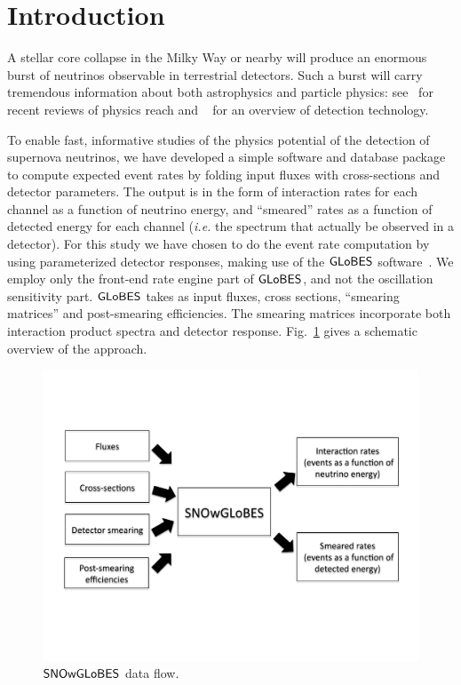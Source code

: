 \documentclass[12pt]{article}
\newcommand{\globes}{\sf{GLoBES}}
\newcommand{\snowglobes}{\sf{SNOwGLoBES}}
\begin{document}
\section{Introduction}

A stellar core collapse in the Milky Way or nearby will produce an enormous burst of neutrinos observable in terrestrial detectors.  Such a burst will carry tremendous information about both astrophysics and particle physics: see~\cite{Dighe:2008dq} for recent reviews of physics reach and ~\cite{Scholberg:2007nu} for an overview of detection technology.

To enable fast, informative studies of the physics potential of the
detection of supernova neutrinos, we have developed a simple software
and database package to compute expected event rates by folding input
fluxes with cross-sections and detector  parameters.  The output is in the
form of interaction rates for each channel as a function of neutrino
energy, and ``smeared'' rates as a function of detected energy for
each channel (\textit{i.e.} the spectrum that actually be observed in a
detector).  For this study we have chosen to do the event rate
computation by using parameterized detector responses, making use of
the $\globes$ software~\cite{Huber:2004ka,globes}.  We employ only the front-end rate
engine part of $\globes$, and not the oscillation sensitivity part.
$\globes$ takes as input fluxes, cross sections, ``smearing matrices''
and post-smearing efficiencies.  The smearing matrices incorporate
both interaction product spectra and detector response.
Fig.~\ref{fig:schematic} gives a schematic overview of the approach.

\begin{figure}
\begin{center}
\includegraphics[height=.3\textheight]{figures/schematic.pdf}
\end{center}
\caption{$\snowglobes$ data flow.}\label{fig:schematic}
\end{figure}
\end{document}
